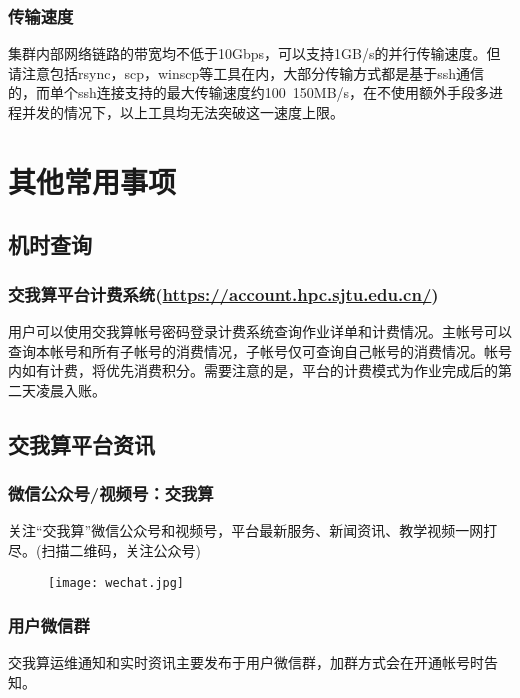 \documentclass[cn, 12pt, hang, black, chinese]{elegantbook}
\begin{document}
\subsection*{传输速度}

集群内部网络链路的带宽均不低于10Gbps，可以支持1GB/s的并行传输速度。但请注意包括rsync，scp，winscp等工具在内，大部分传输方式都是基于ssh通信的，而单个ssh连接支持的最大传输速度约100~150MB/s，在不使用额外手段多进程并发的情况下，以上工具均无法突破这一速度上限。

\chapter{其他常用事项}

\section{机时查询}
\subsection*{交我算平台计费系统(\href{https://account.hpc.sjtu.edu.cn/}{https://account.hpc.sjtu.edu.cn/})}
用户可以使用交我算帐号密码登录计费系统查询作业详单和计费情况。主帐号可以查询本帐号和所有子帐号的消费情况，子帐号仅可查询自己帐号的消费情况。帐号内如有计费，将优先消费积分。需要注意的是，平台的计费模式为作业完成后的第二天凌晨入账。

\section{交我算平台资讯}
\subsection*{微信公众号/视频号：交我算}
关注“交我算”微信公众号和视频号，平台最新服务、新闻资讯、教学视频一网打尽。(扫描二维码，关注公众号)

\begin{figure}[!htb]
\centering
\texttt{[image: wechat.jpg]}
\end{figure}

\subsection*{用户微信群}
交我算运维通知和实时资讯主要发布于用户微信群，加群方式会在开通帐号时告知。
\end{document}
